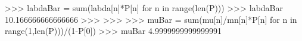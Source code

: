 
>>> labdaBar = sum(labda[n]*P[n] for n in range(len(P)))
>>> labdaBar
10.166666666666666
>>>
>>>
>>> muBar = sum(mu[n]/mn[n]*P[n] for n in range(1,len(P)))/(1-P[0])
>>> muBar
4.9999999999999991

